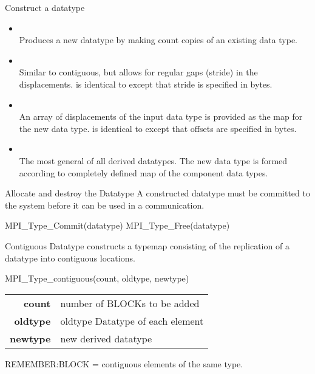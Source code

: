 \documentclass[aspectratio=43]{beamer}
\begin{document}
\begin{frame}[fragile]{Construct a datatype}
\begin{itemize}
\item {}\\
Produces a new datatype by making count copies of an existing data type.

\item {}\\
Similar to contiguous, but allows for regular gaps (stride) in the displacements.
 is identical to  except that stride is specified in bytes.

\item {}\\
An array of displacements of the input data type is provided as the map for the new data type.
 is identical to  except that offsets are specified in bytes.

\item {}\\
The most general of all derived datatypes. The new data type is formed according to completely defined map of the component data types.
\end{itemize}

\end{frame}

\begin{frame}[fragile]{Allocate and destroy the Datatype}
A constructed datatype must be committed to the system before it can be used in a communication.\\
\begin{Pseudolisting}[]{}
MPI_Type_Commit(datatype)
MPI_Type_Free(datatype)
\end{Pseudolisting}
\end{frame}

\begin{frame}[fragile]{Contiguous Datatype}
 constructs a typemap consisting of the replication of a datatype into contiguous locations.
\begin{Pseudolisting}[]{}
MPI_Type_contiguous(count, oldtype, newtype)
\end{Pseudolisting}
\begin{black1block}{}
\begin{tabular}{rp{8cm}}
\textbf{count} & number of BLOCKs to be added\\
\textbf{oldtype} & oldtype Datatype of each element\\
\textbf{newtype} & new derived datatype\\
\end{tabular}
\end{black1block}
REMEMBER:\@ BLOCK = contiguous elements of the same type.
\end{frame}
\end{document}
